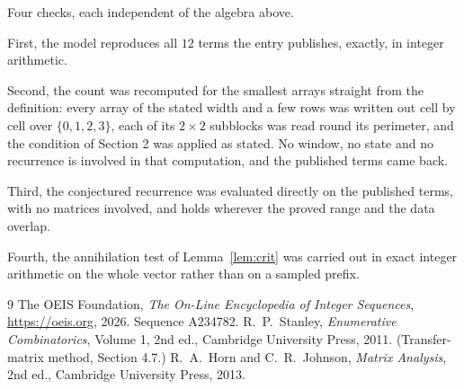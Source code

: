 \documentclass[11pt,a4paper]{article}
\theoremstyle{plain}
\theoremstyle{definition}
\begin{document}
Four checks, each independent of the algebra above.

First, the model reproduces all $12$ terms the entry publishes, exactly, in integer
arithmetic.

Second, the count was recomputed for the smallest arrays straight from the definition: every
array of the stated width and a few rows was written out cell by cell over $\{0,1,2,3\}$, each of
its $2\times2$ subblocks was read round its perimeter, and the condition of Section 2 was
applied as stated. No window, no state and no recurrence is involved in that computation, and
the published terms came back.

Third, the conjectured recurrence was evaluated directly on the published terms, with no
matrices involved, and holds wherever the proved range and the data overlap.

Fourth, the annihilation test of Lemma~\ref{lem:crit} was carried out in exact integer
arithmetic on the whole vector rather than on a sampled prefix.

\begin{thebibliography}{9}
 The OEIS Foundation, \emph{The On-Line Encyclopedia of Integer
Sequences}, \url{https://oeis.org}, 2026. Sequence A234782.
 R.~P.~Stanley, \emph{Enumerative Combinatorics}, Volume 1, 2nd ed.,
Cambridge University Press, 2011. (Transfer-matrix method, Section 4.7.)
 R.~A.~Horn and C.~R.~Johnson, \emph{Matrix Analysis}, 2nd ed., Cambridge
University Press, 2013.
\end{thebibliography}
\end{document}
